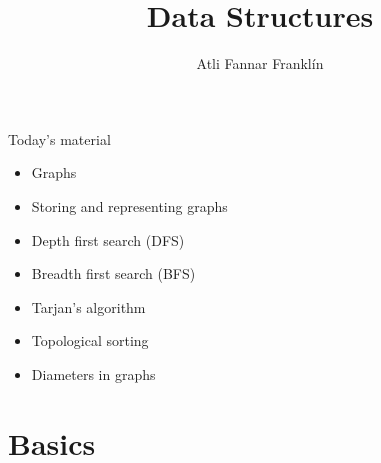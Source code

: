 \documentclass{beamer}
\title{Data Structures}
\author{Atli Fannar Franklín}
\institute{\href{http://ru.is/td}{School of Computer Science} \\[2pt] \href{http://ru.is}{Reykjavík University}}
\begin{document}
\maketitle

\begin{frame}[plain]{Today's material}
    \begin{itemize}
        \item Graphs
        \item Storing and representing graphs
        \item Depth first search (DFS)
        \item Breadth first search (BFS)
        \item Tarjan's algorithm
        \item Topological sorting
        \item Diameters in graphs
    \end{itemize}
\end{frame}

\section*{Basics}
\end{document}
